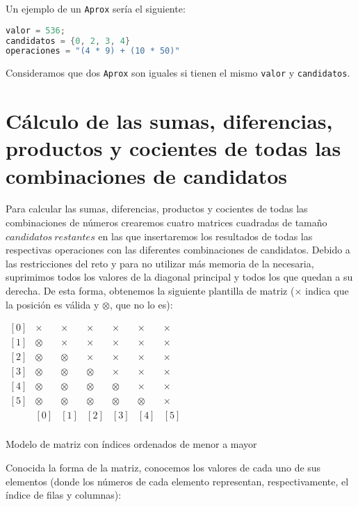 Un ejemplo de un \texttt{Aprox} sería el siguiente:

\begin{lstlisting}[language=C++]
valor = 536;
candidatos = {0, 2, 3, 4}
operaciones = "(4 * 9) + (10 * 50)"
\end{lstlisting}

Consideramos que dos \texttt{Aprox} son iguales si tienen el mismo \texttt{valor} y \texttt{candidatos}.

\section{Cálculo de las sumas, diferencias, productos y cocientes de todas las combinaciones de candidatos}

Para calcular las sumas, diferencias, productos y cocientes de todas las combinaciones de números crearemos cuatro matrices cuadradas de tamaño $candidatos\ restantes$ en las que insertaremos los resultados de todas las respectivas operaciones con las diferentes combinaciones de candidatos.
Debido a las restricciones del reto y para no utilizar más memoria de la necesaria, suprimimos todos los valores de la diagonal principal y todos los que quedan a su derecha.
De esta forma, obtenemos la siguiente plantilla de matriz ($\times$ indica que la posición es válida y $\otimes$, que no lo es):


\begin{center}
$\begin{matrix}
[0] & \times  & \times  & \times  & \times  & \times  & \times \\
[1] & \otimes & \times  & \times  & \times  & \times  & \times \\
[2] & \otimes & \otimes & \times  & \times  & \times  & \times \\
[3] & \otimes & \otimes & \otimes & \times  & \times  & \times \\
[4] & \otimes & \otimes & \otimes & \otimes & \times  & \times \\
[5] & \otimes & \otimes & \otimes & \otimes & \otimes & \times \\
    &   [0]   &   [1]   &   [2]   &   [3]   &   [4]   &   [5]  \\
\end{matrix}$

Modelo de matriz con índices ordenados de menor a mayor
\end{center}

Conocida la forma de la matriz, conocemos los valores de cada uno de sus elementos (donde los números de cada elemento representan, respectivamente, el índice de filas y columnas):

